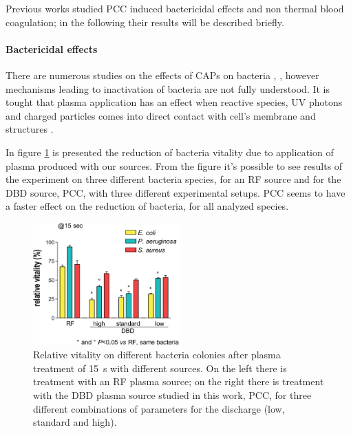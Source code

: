 Previous works studied PCC induced bactericidal effects and non thermal blood coagulation; in the following their results will be described briefly.

\paragraph{Bactericidal effects}
There are numerous studies on the effects of CAPs on bacteria \cite{1167632}, \cite{1673530}, however mechanisms leading to inactivation of bacteria are not fully understood. It is tought that plasma application has an effect when reactive species, UV photons and charged particles comes into direct contact with cell's membrane and structures \cite{plmed_review}.

In figure \ref{fig:bact} is presented the reduction of bacteria vitality due to application of plasma produced with our sources. From the figure it's possible to see results of the experiment on three different bacteria species, for an RF source and for the DBD source, PCC, with three different experimental setups. PCC seems to have a faster effect on the reduction of bacteria, for all analyzed species. 
\begin{figure}
 \centering
 \includegraphics[width=0.5\textwidth]{Images/Intro/bacteria2.png}
 \caption{Relative vitality on different bacteria colonies after plasma treatment of \SI{15}{\second} with different sources. On the left there is treatment with an RF plasma source; on the right there is treatment with the DBD plasma source studied in this work, PCC, for three different combinations of parameters for the discharge (low, standard and high).}
 \label{fig:bact}
\end{figure}


